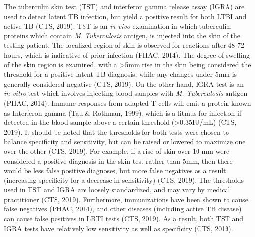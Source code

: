 \documentclass[sn-mathphys,Numbered]{sn-jnl}%
\theoremstyle{thmstyleone}%
\theoremstyle{thmstyletwo}%
\theoremstyle{thmstylethree}%
\begin{document}
          The tuberculin skin test (TST) and interferon gamma release assay (IGRA) are used to detect latent TB infection, but yield a positive result for both LTBI and active TB (CTS, 2019). TST is an \textit{in vivo} examination in which tuberculin, proteins which contain \textit{M. Tuberculosis} antigen, is injected into the skin of the testing patient. The localized region of skin is observed for reactions after 48-72 hours, which is indicative of prior infection (PHAC, 2014). The degree of swelling of the skin region is examined, with a >5mm rise in the skin being considered the threshold for a positive latent TB diagnosis, while any changes under 5mm is generally considered negative (CTS, 2019). 
    On the other hand, IGRA test is an \textit{in vitro} test which involves injecting blood samples with \textit{M. Tuberculosis} antigen (PHAC, 2014). Immune responses from adapted T cells will emit a protein known as Interferon-gamma (Tau \& Rothman, 1999), which is a litmus for infection if detected in the blood sample above a certain threshold (>0.35IU/mL) (CTS, 2019). It should be noted that the thresholds for both tests were chosen to balance specificity and sensitivity, but can be raised or lowered to maximize one over the other (CTS, 2019). For example, if a rise of skin over 10 mm were considered a positive diagnosis in the skin test rather than 5mm, then there would be less false positive diagnoses, but more false negatives as a result (increasing specificity for a decrease in sensitivity) (CTS, 2019). The thresholds used in TST and IGRA are loosely standardized, and may vary by medical practitioner (CTS, 2019). Furthermore, immunizations have been shown to cause false negatives (PHAC, 2014), and other diseases (including active TB disease) can cause false positives in LBTI tests (CTS, 2019). As a result, both TST and IGRA tests have relatively low sensitivity as well as specificity (CTS, 2019).
\end{document}
